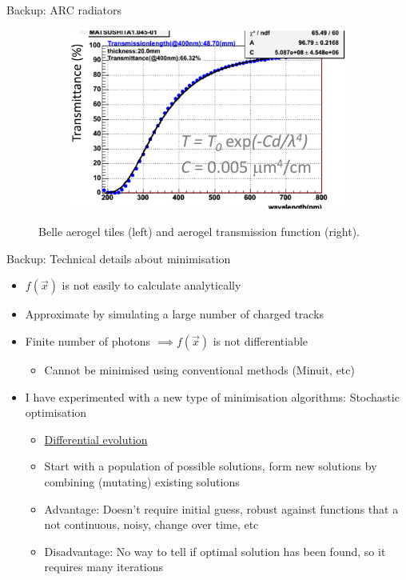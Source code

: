 \documentclass{beamer}
\begin{document}
\begin{frame}{Backup: ARC radiators}
\begin{figure}
\begin{subfigure}{0.25\textwidth}
    \end{subfigure}%
    \hspace{0.2cm}
    \begin{subfigure}{0.25\textwidth}
      \includegraphics[width = 1.0\textwidth]{Plots/AerogelTransmission.png}
    \end{subfigure}
    \caption{Belle aerogel tiles (left) and aerogel transmission function (right).}
  \end{figure}
\end{frame}

\begin{frame}{Backup: Technical details about minimisation}
  \setlength\itemsep{1.0em}
  \begin{itemize}
    \item{$f(\vec{x})$ is not easily to calculate analytically}
    \item{Approximate by simulating a large number of charged tracks}
    \item{Finite number of photons $\implies f(\vec{x})$ is not differentiable}
    \begin{itemize}
      \item{Cannot be minimised using conventional methods (Minuit, etc)}
    \end{itemize}
    \item{I have experimented with a new type of minimisation algorithms: Stochastic optimisation}
    \begin{itemize}
      \item{\href{https://en.wikipedia.org/wiki/Differential_evolution}{Differential evolution}}
      \item{Start with a population of possible solutions, form new solutions by combining (mutating) existing solutions}
      \item{Advantage: Doesn't require initial guess, robust against functions that a not continuous, noisy, change over time, etc}
      \item{Disadvantage: No way to tell if optimal solution has been found, so it requires many iterations}
    \end{itemize}
  \end{itemize}
\end{frame}
\end{document}
